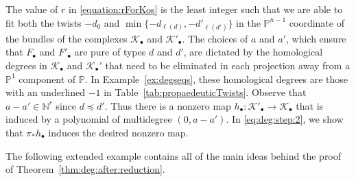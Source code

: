 \documentclass[12pt]{amsart}
\theoremstyle{definition}
\newcommand{\KK}{\mathcal{K}}
\newcommand{\PP}{\mathbb{P}}
\newcommand{\NN}{\mathbb{N}}
\begin{document}
The value of $r$ in \eqref{equation:rForKos} is the least integer such
that we are able to fit both the twists 
$-d_0$ and $\min\{-d_{\ell(d)}, -d'_{\ell(d')}\}$ 
in the $\PP^{n-1}$ coordinate of the bundles 
of the complexes $\KK_\bullet$ and $\KK'_\bullet$. The
choices of $a$ and $a'$, which ensure that $F_\bullet$ and
$F'_\bullet$ are pure of types $d$ and $d'$, are dictated by the
homological degrees in $\KK_\bullet$ and $\KK_\bullet'$ that need to
be eliminated in each projection away from a $\PP^1$ component of $\PP$. 
In Example~\ref{ex:degseqs}, these homological degrees are those with an
underlined $-1$ in Table~\ref{tab:propaedeuticTwists}. 
Observe that $a - a' \in \NN^r$ since $d\preceq d'$. 
Thus there is a nonzero map
$h_\bullet\colon\KK'_\bullet\to\KK_\bullet$ that is induced by a
polynomial of multidegree $(0,a-a')$.  In \eqref{eq:deg:step:2}, we
show that $\pi_*h_\bullet$ induces the desired nonzero map. 

The following extended example contains all of the main ideas
behind the proof of Theorem~\ref{thm:deg:after:reduction}.
\end{document}
